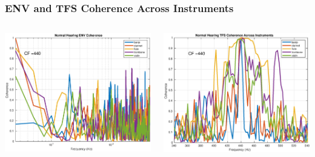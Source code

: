 \documentclass[aspectratio=1610]{beamer}
\begin{document}
\begin{frame}

\frametitle{ENV and TFS Coherence Across Instruments}

\begin{columns}
\begin{column}{0.55\textwidth}
\includegraphics[scale = .4]{all_ENV_coherence_440}
\end{column}
\begin{column}{0.56\textwidth}
\includegraphics[scale = .4]{all_TFS_coherence_440}
\end{column}
\end{columns}

\end{frame}
\end{document}
